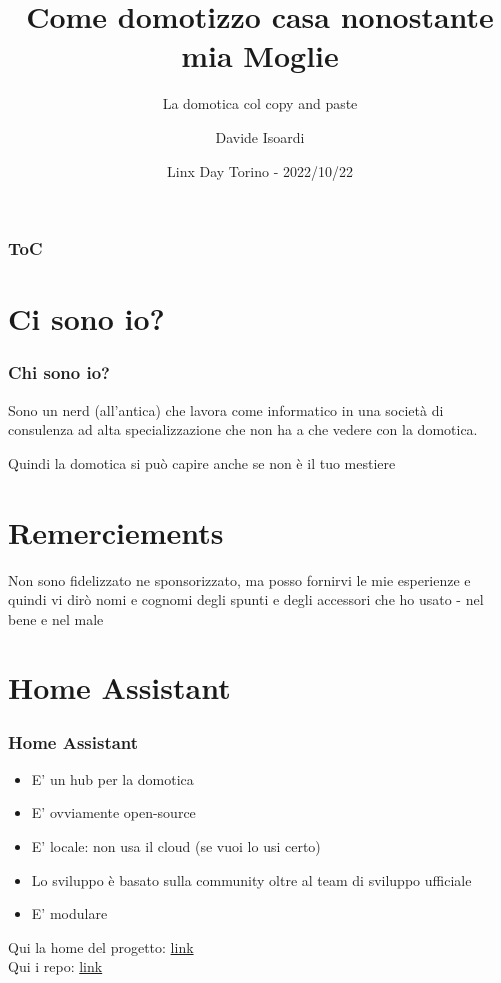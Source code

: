 \documentclass[hyperref={pdfpagelabels=false}]{beamer}
\title{Come domotizzo casa nonostante mia Moglie}
\subtitle{La domotica col copy and paste}
\author{Davide Isoardi}
\date{Linx Day Torino - 2022/10/22}
\newif\ifshowtoc
\begin{document}
	\begin{frame}
		\titlepage
	\end{frame} 
	
	
	\begin{frame}
		\frametitle{ToC}
		\tableofcontents[hidesubsections]
	\end{frame} 
	
	
	\section{Ci sono io?} 
	\begin{frame}
		\frametitle{Chi sono io?} 
		Sono un nerd (all'antica) che lavora come informatico in una società di consulenza ad alta specializzazione che non ha a che vedere con la domotica.
		
		Quindi la domotica si può capire anche se non è il tuo mestiere
	\end{frame}
	\showtocfalse%
	\section*{Remerciements}
	\begin{frame}
		\begin{block}{Non sono fidelizzato ne sponsorizzato, ma posso fornirvi le mie esperienze e quindi vi dirò nomi e cognomi degli spunti e degli accessori che ho usato - nel bene e nel male}
		\end{block}
	\end{frame}
	\section{Home Assistant}
	\begin{frame}
		\frametitle{Home Assistant}
		\begin{itemize}
			\item E' un hub per la domotica
			\item E' ovviamente open-source
			\item E' locale: non usa il cloud (se vuoi lo usi certo)
			\item Lo sviluppo è basato sulla community oltre al team di sviluppo ufficiale
			\item E' modulare
		\end{itemize}
		\medskip
		\normalsize Qui la home del progetto: \href{https://www.home-assistant.io/}{link}\\	\normalsize Qui i repo: \href{https://github.com/home-assistant}{link}
	\end{frame}
	
\end{document}
